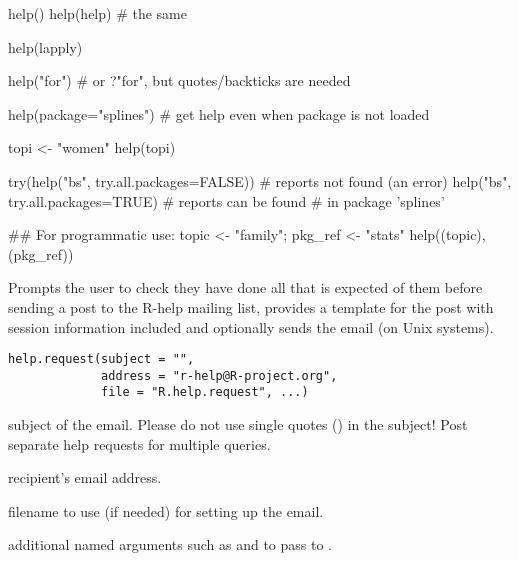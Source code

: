%
\begin{Examples}
\begin{ExampleCode}
help()
help(help)              # the same

help(lapply)

help("for")             # or ?"for", but quotes/backticks are needed

help(package="splines") # get help even when package is not loaded

topi <- "women"
help(topi)

try(help("bs", try.all.packages=FALSE)) # reports not found (an error)
help("bs", try.all.packages=TRUE)       # reports can be found
                                        # in package 'splines'

## For programmatic use:
topic <- "family"; pkg_ref <- "stats"
help((topic), (pkg_ref))
\end{ExampleCode}
\end{Examples}
%
\begin{Description}\relax
Prompts the user to check they have done all that is expected of them
before sending a post to the R-help mailing list, provides a template
for the post with session information included and optionally sends
the email (on Unix systems).
\end{Description}
%
\begin{Usage}
\begin{verbatim}
help.request(subject = "",
             address = "r-help@R-project.org",
             file = "R.help.request", ...)
\end{verbatim}
\end{Usage}
%
\begin{Arguments}
\begin{ldescription}
\item[\code{subject}] subject of the email.  Please do not use single quotes
() in the subject!  Post separate help requests for multiple
queries.
\item[\code{address}] recipient's email address.
\item[\code{file}] filename to use (if needed) for setting up the email.
\item[\code{...}] additional named arguments such as  and
 to pass to .
\end{ldescription}
\end{Arguments}
